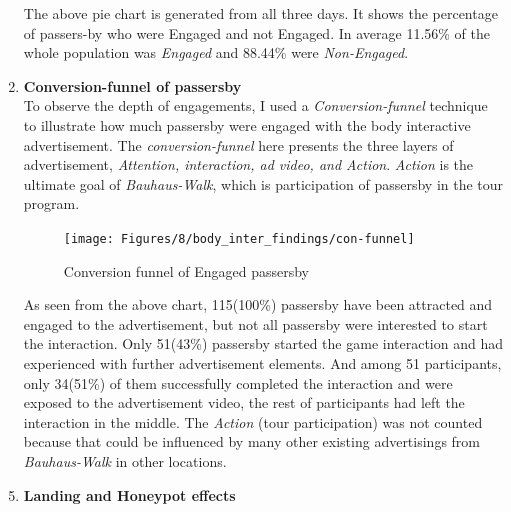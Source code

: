 \begin{enumerate}
The above pie chart is generated from all three days. It shows the percentage of passers-by who were Engaged and not Engaged. In average 11.56\% of the whole population was \emph{Engaged} and 88.44\% were \emph{Non-Engaged}.




\item \textbf{Conversion-funnel of passersby} \\
To observe the depth of engagements, I used a \emph{Conversion-funnel} \cite{convfunnel} technique to illustrate how much passersby were engaged with the body interactive advertisement. The \emph{conversion-funnel} here presents the three layers of advertisement, \emph{Attention, interaction, ad video, and Action}. \emph{Action} is the ultimate goal of \emph{Bauhaus-Walk}, which is participation of passersby in the tour program. 

\begin{figure}[H]
    \centering
    \texttt{[image: Figures/8/body\_inter\_findings/con-funnel]}
    \caption{Conversion funnel of Engaged passersby}%
    \label{fig:bodyengagedpasserbypercentage}%
\end{figure}

As seen from the above chart, 115(100\%) passersby have been attracted and engaged to the advertisement, but not all passersby were interested to start the interaction. Only 51(43\%) passersby started the game interaction and had experienced with further advertisement elements. And among 51 participants, only 34(51\%) of them successfully completed the interaction and were exposed to the advertisement video, the rest of participants had left the interaction in the middle. The \emph{Action} (tour participation) was not counted because that could be influenced by many other existing advertisings from \emph{Bauhaus-Walk} in other locations.



\end{enumerate}


\newpage
\begin{enumerate}
\setcounter{enumi}{4}
\item \textbf{Landing and Honeypot effects}
\end{enumerate}


